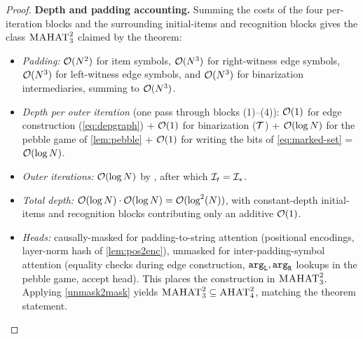 \documentclass{article}
\begin{document}
\begin{proof}
    \textbf{Depth and padding accounting.} Summing the costs of the four per-iteration blocks and the surrounding initial-items and recognition blocks gives the class ${{\textsc{MAHAT}}}^2_3$ claimed by the theorem:
    \begin{itemize}[noitemsep,topsep=0pt,leftmargin=15pt]
        \item \emph{Padding:} ${{ \mathcal{O}}}({{ N}}^2)$ for item symbols, ${{ \mathcal{O}}}({{ N}}^3)$ for right-witness edge symbols, ${{ \mathcal{O}}}({{ N}}^3)$ for left-witness edge symbols, and ${{ \mathcal{O}}}({{ N}}^3)$ for binarization intermediaries, summing to ${{ \mathcal{O}}}({{ N}}^3)$.
        \item \emph{Depth per outer iteration} (one pass through blocks (1)--(4)): ${{ \mathcal{O}}}(1)$ for edge construction (\cref{eq:depgraph}) + ${{ \mathcal{O}}}(1)$ for binarization (${{ \mathcal{T}}}$) + ${{ \mathcal{O}}}(\log {{ N}})$ for the pebble game of \cref{lem:pebble} + ${{ \mathcal{O}}}(1)$ for writing the bits of \cref{eq:marked-set} = ${{ \mathcal{O}}}(\log {{ N}})$.
        \item \emph{Outer iterations:} ${{ \mathcal{O}}}(\log {{ N}})$ by \citet{chytil-unambiguous}, after which ${{\mathcal{I}}}_t = {{\mathcal{I}}}_*$.
        \item \emph{Total depth:} ${{ \mathcal{O}}}(\log {{ N}}) \cdot {{ \mathcal{O}}}(\log {{ N}}) = {{ \mathcal{O}}}(\log^2({{ N}}))$, with constant-depth initial-items and recognition blocks contributing only an additive ${{ \mathcal{O}}}(1)$.
        \item \emph{Heads:} causally-masked for padding-to-string attention (positional encodings, layer-norm hash of \cref{lem:pos2enc}), unmasked for inter-padding-symbol attention (equality checks during edge construction, ${\mathtt{arg}_\mathtt{L}},{\mathtt{arg}_\mathtt{R}}$ lookups in the pebble game, accept head). This places the construction in ${{\textsc{MAHAT}}}^2_3$. Applying \cref{unmask2mask} yields ${{\textsc{MAHAT}}}^2_3 \subseteq {{\textsc{AHAT}}}^2_4$, matching the theorem statement.
    \end{itemize}
\end{proof}
\end{document}
